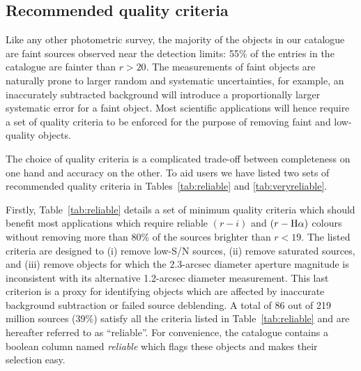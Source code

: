 \documentclass[useAMS,usenatbib]{mn2e}
\def\ha{\mbox{H$\rm \alpha$}}
\begin{document}
\subsection{Recommended quality criteria}
\label{sec:qualitycriteria}

Like any other photometric survey,
the majority of the objects in our catalogue
are faint sources observed near the detection limits:
55\% of the entries in the catalogue
are fainter than $r > 20$.
The measurements of faint objects
are naturally prone to larger
random and systematic uncertainties,
for example, an inaccurately subtracted background
will introduce a proportionally larger systematic error
for a faint object.
Most scientific applications will hence require a set of
quality criteria to be enforced for the purpose
of removing faint and low-quality objects.

The choice of quality criteria is a complicated
trade-off between completeness on one hand
and accuracy on the other.
To aid users we have listed two sets of
recommended quality criteria 
in Tables~\ref{tab:reliable} and \ref{tab:veryreliable}.

Firstly, Table~\ref{tab:reliable} details
a set of minimum quality criteria
which should benefit most applications
which require reliable $(r-i)$ and $(r-\ha)$ colours
without removing more than 80\%
of the sources brighter than $r < 19$.
The listed criteria are designed to 
(i) remove low-S/N sources, 
(ii) remove saturated sources,
and (iii) remove objects for which the 2.3-arcsec diameter
aperture magnitude is inconsistent 
with its alternative 1.2-arcsec diameter measurement.
This last criterion is a proxy
for identifying objects which are affected
by inaccurate background subtraction
or failed source deblending.
A total of 86 out of 219 million sources 
(39\%) satisfy all the criteria listed in Table~\ref{tab:reliable}
and are hereafter referred to as ``reliable''.
For convenience, the catalogue contains a boolean column
named \emph{reliable} which flags these objects
and makes their selection easy.
\end{document}
